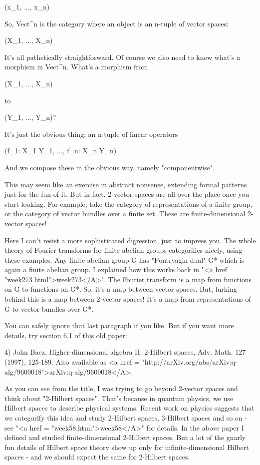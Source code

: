 (x_{1}, ..., x_{n})

So, Vect^{n} is the category where an object is an n-tuple of 
vector spaces:

(X_{1}, ..., X_{n})

It's all pathetically straightforward.  Of course we also need
to know what's a morphism in Vect^{n}.  What's a morphism from 

(X_{1}, ..., X_{n})

to

(Y_{1}, ..., Y_{n})?

It's just the obvious thing: an n-tuple of linear operators

(f_{1}: X_{1} \to  Y_{1}, ..., f_{n}: X_{n} \to  Y_{n})

And we compose these in the obvious way, namely "componentwise".

This may seem like an exercise in abstract nonsense, extending formal 
patterns just for the fun of it.  But in fact, 2-vector spaces are
all over the place once you start looking.  For example, take
the category of representations of a finite group, or the category
of vector bundles over a finite set.  These are finite-dimensional
2-vector spaces!  

Here I can't resist a more sophisticated digression, just to impress
you.  The whole theory of Fourier transforms for finite abelian groups 
categorifies nicely, using these examples.  Any finite abelian group 
G has "Pontryagin dual" G* which is again a finite abelian group.   
I explained how this works back in "<a href = "week273.html">week273</A>".  The Fourier transform 
is a map from functions on G to functions on G*.  So, it's a map 
between vector spaces.  But, lurking behind this is a map between 
2-vector spaces!  It's a map from representations of G to vector 
bundles over G*.

You can safely ignore that last paragraph if you like.  But if you 
want more details, try section 6.1 of this old paper:

4) John Baez, Higher-dimensional algebra II: 2-Hilbert spaces,
Adv. Math. 127 (1997), 125-189.  Also available as 
<a href = "http://arXiv.org/abs/arXiv:q-alg/9609018">arXiv:q-alg/9609018</A>.

As you can see from the title, I was trying to go beyond 2-vector
spaces and think about "2-Hilbert spaces".  That's because
in quantum physics, we use Hilbert spaces to describe physical
systems.  Recent work on physics suggests that we categorify this idea
and study 2-Hilbert spaces, 3-Hilbert spaces and so on - see "<a
href = "week58.html">week58</A>" for details.  In the above paper
I defined and studied finite-dimensional 2-Hilbert spaces.  But a lot
of the gnarly fun details of Hilbert space theory show up only for
infinite-dimensional Hilbert spaces - and we should expect the same
for 2-Hilbert spaces.

